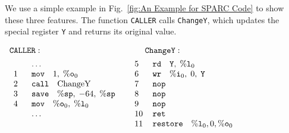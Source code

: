 We use a simple example
in Fig.~\ref{fig:An Example for SPARC Code}
to show these three features.
The function \texttt{CALLER}
calls \texttt{ChangeY},
which updates the special register \texttt{Y}
and returns its original value.
\vspace*{-1em}
\begin{center}
    $
        \begin{array}{ll}
            \texttt{CALLER}: & 
            \quad\hspace*{2.5ex} \texttt{ChangeY} : \\[1ex]
            \begin{array}{ll}
                \quad & \dots \\
                \text{1} \ \ & \texttt{mov} \quad 1, \; \%\texttt{o}_{0} \\
                \text{2} & \texttt{call} \quad \text{ChangeY} \\
                \text{3} & 
                    \texttt{save} \quad \%\texttt{sp}, \; -64, \; \%\texttt{sp} \\
                \text{4} & 
                    \texttt{mov} \quad \%\texttt{o}_{0}, \; \%\texttt{l}_{0} \\
                \quad & \dots \\
                \quad
            \end{array} & \
            \begin{array}{ll}
                \text{5} \ \ & 
                    \texttt{rd} \quad \texttt{Y}, \; \%\texttt{l}_{0} \\
                \text{6} & 
                    \texttt{wr} \quad \%\texttt{i}_{0}, \; 0, \; \texttt{Y} \\
                \text{7} & \texttt{nop} \\
                \text{8} & \texttt{nop} \\
                \text{9} & \texttt{nop} \\
                \text{10} & \texttt{ret} \\
                \text{11} & 
                    \texttt{restore} \quad \%\texttt{l}_{0}, 0, \%\texttt{o}_{0}
            \end{array}
        \end{array}
    $
    \label{fig:An Example for SPARC Code}
\end{center}

